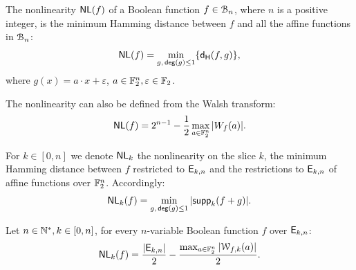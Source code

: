 \documentclass[11pt]{llncs}
\begin{document}
\begin{definition} \label{def:nl}
	The nonlinearity $\mathsf{NL}(f)$ of a Boolean function $f\in \mathcal{B}_n$, where $n$ is a positive integer, is the minimum Hamming distance between $f$ and all the affine functions in $\mathcal{B}_n$:
	\[ \mathsf{NL}(f) = \min_{g,\, \mathsf{deg}(g)\leq 1} \{ \mathsf{d_H}(f,g) \}{,} \]
	where $g(x)=a\cdot x+\varepsilon$, $a\in \mathbb{F}_2^n, \varepsilon\in \mathbb{F}_2$. 
	
	The nonlinearity can also be defined from the Walsh transform:
	\[ \mathsf{NL}(f) = 2^{n-1}- \frac{1}{2} \max_{a\in \mathbb{F}_2^n}{|W_{f}(a)|}. \]
	
	
	For $k\in [0,n]$ we denote $\mathsf{NL}_{k}$ the nonlinearity on the slice $k$, the minimum Hamming distance between $f$ restricted to $\mathsf{E}_{k,n}$ and the restrictions to $\mathsf{E}_{k,n}$ of affine functions over $\mathbb{F}_2^n$. 
	Accordingly: 
	\[\mathsf{NL}_{k}(f)=\min_{g,\, \mathsf{deg}(g)\leq 1} |\mathsf{supp}_{k}(f+g)|.\]
\end{definition}


\begin{Prop}\label{prop:nlk}
	Let $n\in \mathbb{N}^*, k\in [0,n]$, for every $n$-variable Boolean function $f$ over $\mathsf{E}_{k,n}$:
	\[ \mathsf{NL}_{k}(f)=\frac{|\mathsf{E}_{k,n}|}{2} -\frac{\max_{a\in \mathbb{F}_2^n} |\mathcal{W}_{f,k}(a)|}{2}  .\]
\end{Prop}




\end{document}
